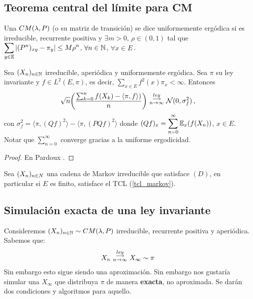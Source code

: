 \subsection{Teorema central del límite para CM}
\begin{definition}
Una %
$CM(\lambda,P)$ (o su matriz de transición) se dice uniformemente ergódica si es irreducible, recurrente positiva y $\exists m>0$, $\rho\in(0,1)$ tal que $\displaystyle\sum_{y\in\mathbb{E}}|(P^n)_{xy}-\pi_y|\leq M\rho^n$, $\forall n\in\mathbb{N}$, $\forall x\in E$\,.
\end{definition}
\begin{theorem}
\label{tcl_markov}
Sea $(X_n)_{n\in \mathbb{N}}$ irreducible, aperiódica y uniformemente ergódica. Sea $\pi$ su ley invariante y $f\in L^2(E,\pi)$, es decir,  $\displaystyle\sum_{x\in E}f^2(x)\pi_x<\infty$. Entonces
$$ \displaystyle \sqrt{n}\bigg(\frac{\sum^n_{k=0}f(X_k)-\langle\pi,f\rangle)}{n}\bigg)\mbox{ }\overset{ley}{\substack{\longrightarrow \\n \to \infty}}\mbox{ }\mathcal{N}(0,\sigma^2_f)\,,$$
con $\sigma^2_f=\langle\pi,(Qf)^2\rangle-\langle\pi,(PQf)^2\rangle$ donde $(Qf)_x=\displaystyle\sum^\infty_{n=0}\mathbb{E}_x(f(X_n))$, $x\in E$.
\newline Notar que $\displaystyle\sum^\infty_{n=0}$ converge gracias a la uniforme ergodicidad.
\end{theorem}
\begin{proof}
\gris En Pardoux \cite{pardoux}.
\negro
\end{proof}
\begin{corolary}
Sea $(X_n)_{n\in N}$ una cadena de Markov irreducible que satisface $(D)$, en particular si $E$ es finito, satisface el TCL (\ref{tcl_markov}).
\end{corolary}
\subsection{Simulación exacta de una ley invariante}
Consideremos $(X_n)_{n\in \mathbb{N}}\sim CM(\lambda,P)$ irreducible, recurrente positiva y aperiódica. Sabemos que:
$$ X_n\mbox{ }\overset{ley}{\substack{\longrightarrow \\n \to \infty}}\mbox{ } X_\infty\sim\pi$$
Sin embargo esto sigue siendo una aproximación. Sin embargo nos gustaría simular una $X_\infty$ que distribuya $\pi$ de manera \textbf{exacta}, no aproximada. Se darán dos condiciones y algoritmos para aquello.
